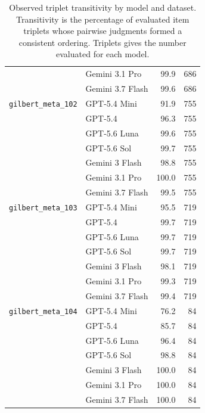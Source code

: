 \documentclass[11pt]{article}
\begin{document}
\begin{table}[p]
\begin{tabular}{llrr}
      & Gemini 3.1 Pro     & 99.9 & 686 \\
      & Gemini 3.7 Flash   & 99.6 & 686 \\
    \addlinespace
    \texttt{gilbert\_meta\_102}
      & GPT-5.4 Mini       & 91.9 & 755 \\
      & GPT-5.4            & 96.3 & 755 \\
      & GPT-5.6 Luna       & 99.6 & 755 \\
      & GPT-5.6 Sol        & 99.7 & 755 \\
      & Gemini 3 Flash     & 98.8 & 755 \\
      & Gemini 3.1 Pro     & 100.0 & 755 \\
      & Gemini 3.7 Flash   & 99.5 & 755 \\
    \addlinespace
    \texttt{gilbert\_meta\_103}
      & GPT-5.4 Mini       & 95.5 & 719 \\
      & GPT-5.4            & 99.7 & 719 \\
      & GPT-5.6 Luna       & 99.7 & 719 \\
      & GPT-5.6 Sol        & 99.7 & 719 \\
      & Gemini 3 Flash     & 98.1 & 719 \\
      & Gemini 3.1 Pro     & 99.3 & 719 \\
      & Gemini 3.7 Flash   & 99.4 & 719 \\
    \addlinespace
    \texttt{gilbert\_meta\_104}
      & GPT-5.4 Mini       & 76.2 & 84 \\
      & GPT-5.4            & 85.7 & 84 \\
      & GPT-5.6 Luna       & 96.4 & 84 \\
      & GPT-5.6 Sol        & 98.8 & 84 \\
      & Gemini 3 Flash     & 100.0 & 84 \\
      & Gemini 3.1 Pro     & 100.0 & 84 \\
      & Gemini 3.7 Flash   & 100.0 & 84 \\
    \bottomrule
  \end{tabular}
  \caption{Observed triplet transitivity by model and dataset. Transitivity is the percentage of evaluated item triplets whose pairwise judgments formed a consistent ordering. Triplets gives the number evaluated for each model.}
  \label{tab:triplet_transitivity}
\end{table}
\end{document}
